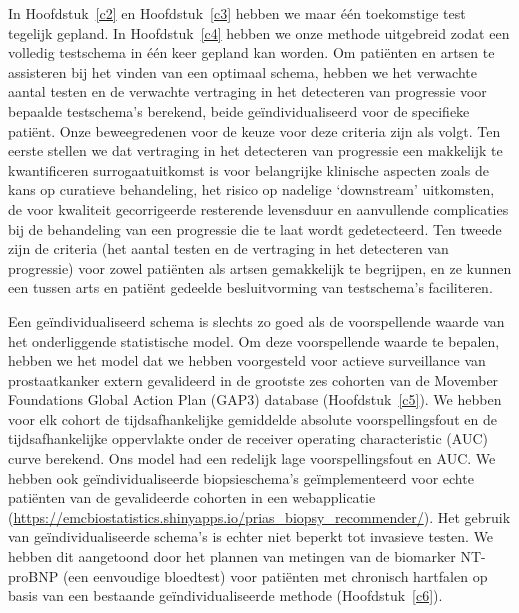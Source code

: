 In Hoofdstuk~\ref{c2} en Hoofdstuk~\ref{c3} hebben we maar één toekomstige test tegelijk gepland. In Hoofdstuk~\ref{c4} hebben we onze methode uitgebreid zodat een volledig testschema in één keer gepland kan worden. Om patiënten en artsen te assisteren bij het vinden van een optimaal schema, hebben we het verwachte aantal testen en de verwachte vertraging in het detecteren van progressie voor bepaalde testschema's berekend, beide geïndividualiseerd voor de specifieke patiënt. Onze beweegredenen voor de keuze voor deze criteria zijn als volgt. Ten eerste stellen we dat vertraging in het detecteren van progressie een makkelijk te kwantificeren surrogaatuitkomst is voor belangrijke klinische aspecten zoals de kans op curatieve behandeling, het risico op nadelige `downstream' uitkomsten, de voor kwaliteit gecorrigeerde resterende levensduur en aanvullende complicaties bij de behandeling van een progressie die te laat wordt gedetecteerd. Ten tweede zijn de criteria (het aantal testen en de vertraging in het detecteren van progressie) voor zowel patiënten als artsen gemakkelijk te begrijpen, en ze kunnen een tussen arts en patiënt gedeelde besluitvorming van testschema's faciliteren.

Een geïndividualiseerd schema is slechts zo goed als de voorspellende waarde van het onderliggende statistische model. Om deze voorspellende waarde te bepalen, hebben we het model dat we hebben voorgesteld voor actieve surveillance van prostaatkanker extern gevalideerd in de grootste zes cohorten van de Movember Foundations Global Action Plan (GAP3) database (Hoofdstuk~\ref{c5}). We hebben voor elk cohort de tijdsafhankelijke gemiddelde absolute voorspellingsfout en de tijdsafhankelijke oppervlakte onder de receiver operating characteristic (AUC) curve berekend. Ons model had een redelijk lage voorspellingsfout en AUC. We hebben ook geïndividualiseerde biopsieschema's geïmplementeerd voor echte patiënten van de gevalideerde cohorten in een webapplicatie (\url{https://emcbiostatistics.shinyapps.io/prias_biopsy_recommender/}). Het gebruik van geïndividualiseerde schema's is echter niet beperkt tot invasieve testen. We hebben dit aangetoond door het plannen van metingen van de biomarker NT-proBNP (een eenvoudige bloedtest) voor patiënten met chronisch hartfalen op basis van een bestaande  geïndividualiseerde methode (Hoofdstuk~\ref{c6}).